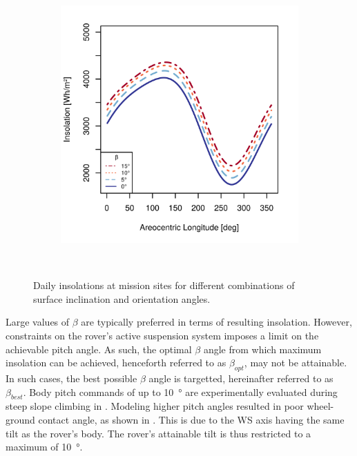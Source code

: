 \begin{figure}[h]
\begin{subfigure}[t]{\subfigureWidth}
            \includegraphics[height=\graphicsHeight]{sections/mars-solar-energy/mission-sites/plots/ismenius-cavus-solar-insolations-for-different-beta-inclinations.png}
            \label{fig:plot:sub:solar-insolations-for-different-beta-ismenius-cavus}
    \end{subfigure}\\[0.8ex]
    \caption[Daily insolations at mission sites]
    {Daily insolations at mission sites for different combinations of surface inclination and orientation angles.}
    \label{fig:plot:solar-insolations-for-different-beta}
\vspace{-2ex}
\end{figure}

Large values of $\beta$ are typically preferred in terms of resulting insolation. However, constraints on the rover's active suspension system imposes a limit on the achievable pitch angle. As such, the optimal $\beta$ angle from which maximum insolation can be achieved, henceforth referred to as $\beta_{opt}$, may not be attainable. In such cases, the best possible $\beta$ angle is targetted, hereinafter referred to as $\beta_{best}$. Body pitch commands of up to \SI{10}{\degree} are experimentally evaluated during steep slope climbing in . Modeling higher pitch angles resulted in poor wheel-ground contact angle, as shown in . This is due to the \ac{WS} axis having the same tilt as the rover's body. The rover's attainable tilt is thus restricted to a maximum of \SI{10}{\degree}.

